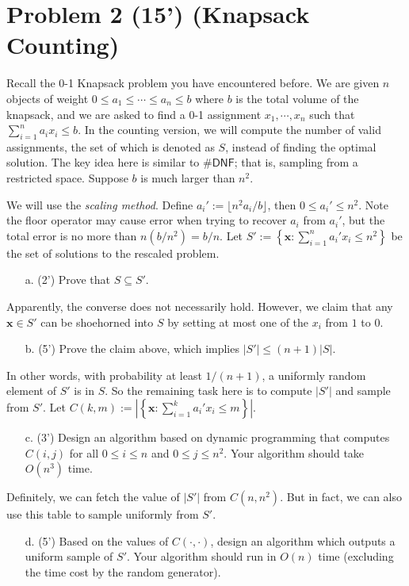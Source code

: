 \section*{Problem 2 (15') (Knapsack Counting)} Recall the 0-1 Knapsack problem you have encountered before. We are given $n$ objects of weight $0\leq a_1\leq\cdots\leq a_n\leq b$ where $b$ is the total volume of the knapsack, and we are asked to find a 0-1 assignment $x_1,\cdots,x_n$ such that $\sum_{i=1}^{n}a_ix_i\leq b$. In the counting version, we will compute the number of valid assignments, the set of which is denoted as $S$, 
 instead of finding the optimal solution. The key idea here is similar to $\mathsf{\#DNF}$; that is, sampling from a restricted space. Suppose $b$ is much larger than $n^2$. 
    
    We will use the \textit{scaling method}. Define $a_i':=\lfloor n^2a_i/b\rfloor$, then $0\leq a_i'\leq n^2$. Note the floor operator may cause error when trying to recover $a_i$ from $a_i'$, but the total error is no more than $n(b/n^2)=b/n$. Let $S':=\left\{\bm x: \sum_{i=1}^{n}a_i'x_i\leq n^2\right\}$ be the set of solutions to the rescaled problem. 
    \begin{itemize}
        \item [a. (2')] Prove that $S\subseteq S'$. 
    \end{itemize}
    Apparently, the converse does not necessarily hold. However, we claim that any $\bm x\in S'$ can be shoehorned into $S$ by setting at most one of the $x_i$ from $1$ to $0$. 
    \begin{itemize}
        \item [b. (5')] Prove the claim above, which implies $|S'|\leq (n+1)|S|$. 
    \end{itemize}
    In other words, with probability at least $1/(n+1)$, a uniformly random element of $S'$ is in $S$. So the remaining task here is to compute $|S'|$ and sample from $S'$. Let $C(k,m):=\left|\left\{\bm x: \sum_{i=1}^{k}a_i'x_i\leq m\right\}\right|$. 
    \begin{itemize}
        \item [c. (3')] Design an algorithm based on dynamic programming that computes $C(i,j)$ for all $0\leq i\leq n$ and $0\leq j\leq n^2$. Your algorithm should take $O(n^3)$ time. 
    \end{itemize}
    Definitely, we can fetch the value of $|S'|$ from $C(n,n^2)$. But in fact, we can also use this table to sample uniformly from $S'$. 
    \begin{itemize}
        \item [d. (5')] Based on the values of $C(\cdot,\cdot)$, design an algorithm which outputs a uniform sample of $S'$. Your algorithm should run in $O(n)$ time (excluding the time cost by the random generator).
    \end{itemize}

